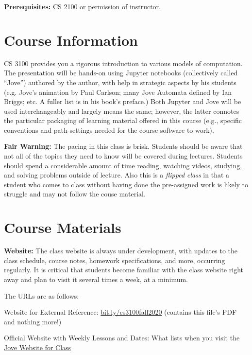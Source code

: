 \documentclass[12pt]{article}
\newcommand{\para}[1]{{\vspace{4pt}\noindent\bf{#1:}}}
\begin{document}
\para{Prerequisites} CS 2100 or permission of instructor.



\section{Course Information}

CS 3100 provides 
you a rigorous introduction to various
models of computation.
The presentation will be hands-on using
Jupyter notebooks (collectively
called ``Jove'') authored by the author,
with help in strategic aspects by his students
(e.g. Jove's animation by Paul Carlson; many
Jove Automata defined by Ian Briggs; etc. A
fuller list is in his book's preface.)
%
Both Jupyter and Jove will be used interchangeably
and largely means the same; however,
the latter connotes the particular packaging
of learning material offered in this course
(e.g., specific conventions and path-settings
needed for the course software to work).


\para{Fair Warning} The pacing in this class is brisk.
Students should be aware that not all of the topics they
need to know will be covered during lectures.
Students should spend a considerable amount of time reading,
watching videos, studying, and solving problems outside of lecture.
%
Also this is a {\em flipped class} in that a student who comes
to class without having done the pre-assigned work is likely to struggle
and may not follow the couse material.

\section{Course Materials}

\para{Website} The class website
is always under development, with updates to the class schedule,
course notes, homework specifications, and more, occurring regularly.
It is critical that students become familiar with the class website
right away and plan to visit it several times a week, at a minimum.

The URLs are as follows:
\begin{compactitem}
\item  Website for External Reference: \url{bit.ly/cs3100fall2020} (contains this file's PDF
   and nothing more!)
\item Official Website with Weekly Lessons and Dates: What lists when you visit
  the
\href{https://github.com/ganeshutah/Jove/tree/master/For_CS3100_Fall2020}{Jove Website for Class}
\end{compactitem}
\end{document}
